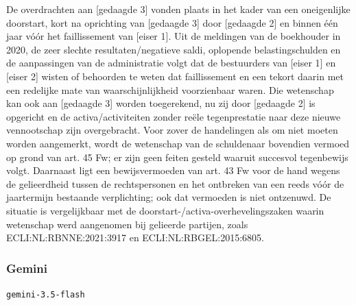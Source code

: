 \documentclass[
  dutch,
  a4paper,
]{article}
\begin{document}
De overdrachten aan {[}gedaagde 3{]} vonden plaats in het kader van een oneigenlijke doorstart, kort na oprichting van {[}gedaagde 3{]} door {[}gedaagde 2{]} en binnen één jaar vóór het faillissement van {[}eiser 1{]}. Uit de meldingen van de boekhouder in 2020, de zeer slechte resultaten/negatieve saldi, oplopende belastingschulden en de aanpassingen van de administratie volgt dat de bestuurders van {[}eiser 1{]} en {[}eiser 2{]} wisten of behoorden te weten dat faillissement en een tekort daarin met een redelijke mate van waarschijnlijkheid voorzienbaar waren. Die wetenschap kan ook aan {[}gedaagde 3{]} worden toegerekend, nu zij door {[}gedaagde 2{]} is opgericht en de activa/activiteiten zonder reële tegenprestatie naar deze nieuwe vennootschap zijn overgebracht. Voor zover de handelingen als om niet moeten worden aangemerkt, wordt de wetenschap van de schuldenaar bovendien vermoed op grond van art. 45 Fw; er zijn geen feiten gesteld waaruit succesvol tegenbewijs volgt. Daarnaast ligt een bewijsvermoeden van art. 43 Fw voor de hand wegens de gelieerdheid tussen de rechtspersonen en het ontbreken van een reeds vóór de jaartermijn bestaande verplichting; ook dat vermoeden is niet ontzenuwd. De situatie is vergelijkbaar met de doorstart-/activa-overhevelingszaken waarin wetenschap werd aangenomen bij gelieerde partijen, zoals ECLI:NL:RBNNE:2021:3917 en ECLI:NL:RBGEL:2015:6805.

\newpage


\subsubsection{Gemini}\label{gemini-8}

\texttt{gemini-3.5-flash}
\end{document}
